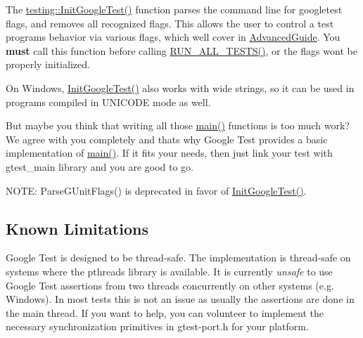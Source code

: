The {\ttfamily \mbox{\hyperlink{namespacetesting_afd726ae08c9bd16dc52f78c822d9946b}{testing\+::\+Init\+Google\+Test()}}} function parses the command line for googletest flags, and removes all recognized flags. This allows the user to control a test program\textquotesingle{}s behavior via various flags, which we\textquotesingle{}ll cover in \mbox{\hyperlink{_obj__test_2lib_2googletest-release-1_88_81_2googletest_2docs_2advanced_8md}{Advanced\+Guide}}. You {\bfseries{must}} call this function before calling {\ttfamily \mbox{\hyperlink{googletest-master_2googletest_2include_2gtest_2gtest_8h_a853a3792807489591d3d4a2f2ff9359f}{R\+U\+N\+\_\+\+A\+L\+L\+\_\+\+T\+E\+S\+T\+S()}}}, or the flags won\textquotesingle{}t be properly initialized.

On Windows, {\ttfamily \mbox{\hyperlink{namespacetesting_afd726ae08c9bd16dc52f78c822d9946b}{Init\+Google\+Test()}}} also works with wide strings, so it can be used in programs compiled in {\ttfamily U\+N\+I\+C\+O\+DE} mode as well.

But maybe you think that writing all those \mbox{\hyperlink{_be_01vektoriaus_2main_8cpp_ae66f6b31b5ad750f1fe042a706a4e3d4}{main()}} functions is too much work? We agree with you completely and that\textquotesingle{}s why Google Test provides a basic implementation of \mbox{\hyperlink{_be_01vektoriaus_2main_8cpp_ae66f6b31b5ad750f1fe042a706a4e3d4}{main()}}. If it fits your needs, then just link your test with gtest\+\_\+main library and you are good to go.

N\+O\+TE\+: {\ttfamily Parse\+G\+Unit\+Flags()} is deprecated in favor of {\ttfamily \mbox{\hyperlink{namespacetesting_afd726ae08c9bd16dc52f78c822d9946b}{Init\+Google\+Test()}}}.

\subsection*{Known Limitations}


\begin{DoxyItemize}
\item Google Test is designed to be thread-\/safe. The implementation is thread-\/safe on systems where the {\ttfamily pthreads} library is available. It is currently {\itshape unsafe} to use Google Test assertions from two threads concurrently on other systems (e.\+g. Windows). In most tests this is not an issue as usually the assertions are done in the main thread. If you want to help, you can volunteer to implement the necessary synchronization primitives in {\ttfamily gtest-\/port.\+h} for your platform. 
\end{DoxyItemize}